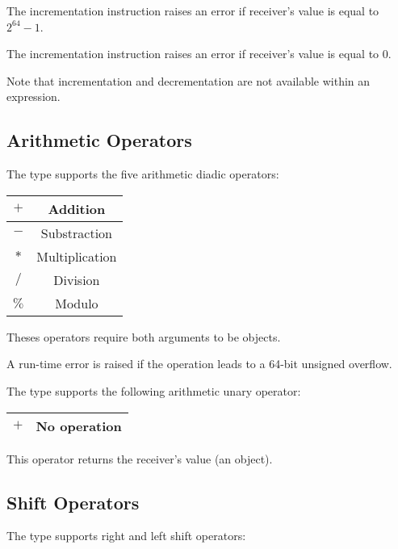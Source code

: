 The incrementation instruction raises an error if receiver's value is equal to $2^{64}-1$.\newline

The incrementation instruction raises an error if receiver's value is equal to 0.\newline

Note that incrementation and decrementation are not available within an expression.




\subsection{Arithmetic Operators}

The  type supports the five arithmetic diadic operators:\newline

\begin{tabular}{|c|c|}
\hline
$+$ & Addition \\
\hline
$-$ & Substraction \\
\hline
$*$ & Multiplication \\
\hline
$/$ & Division \\
\hline
$\%$ & Modulo \\
\hline
\end{tabular}\newline

Theses operators require both arguments to be  objects.\newline

A run-time error is raised if the operation leads to a 64-bit unsigned overflow.

The  type supports the following arithmetic unary operator:\newline

\begin{tabular}{|c|c|}
\hline
$+$ & No operation \\
\hline
\end{tabular}\newline

This operator returns the receiver's value (an   object).




\subsection{Shift Operators}


The  type supports right and left shift operators:\newline

